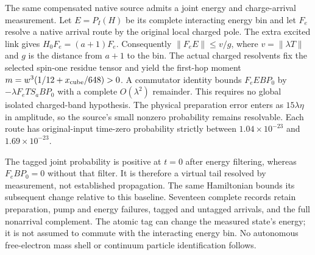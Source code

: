 The same compensated native source admits a joint energy and charge-arrival
measurement. Let $E=P_I(H)$ be its complete interacting energy bin and let
$F_e$ resolve a native arrival route by the original local charged pole.
The extra excited link gives $H_0F_e=(a+1)F_e$. Consequently
$\|F_eE\|\leq v/g$, where $v=\|\lambda T\|$ and $g$ is the distance
from $a+1$ to the bin. The actual charged resolvents fix the selected
spin-one residue tensor and yield the first-hop moment
$m=w^3(1/12+x_{\rm cube}/648)>0$. A commutator identity bounds
$F_eEBP_0$ by $-\lambda F_eTS_aBP_0$ with a complete $O(\lambda^2)$
remainder. This requires no global isolated charged-band hypothesis.
The physical preparation error enters as $15\lambda\eta$ in amplitude,
so the source's small nonzero probability remains resolvable.
Each route has original-input time-zero probability strictly between
$1.04\times10^{-23}$ and $1.69\times10^{-23}$.

The tagged joint probability is positive at $t=0$ after energy
filtering, whereas $F_eBP_0=0$ without that filter. It is therefore a
virtual tail resolved by measurement, not established propagation. The
same Hamiltonian bounds its subsequent change relative to this baseline.
Seventeen complete records retain preparation, pump and energy failures,
tagged and untagged arrivals, and the full nonarrival complement. The
atomic tag can change the measured state's energy; it is not assumed
to commute with the interacting energy bin. No autonomous free-electron
mass shell or continuum particle identification follows.
